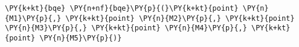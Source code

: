 \begin{Verbatim}[commandchars=\\\{\}]
    \PY{k+kt}{bqe} \PY{n+nf}{bqe}\PY{p}{(}\PY{k+kt}{point} \PY{n}{M1}\PY{p}{,} \PY{k+kt}{point} \PY{n}{M2}\PY{p}{,} \PY{k+kt}{point} \PY{n}{M3}\PY{p}{,} \PY{k+kt}{point} \PY{n}{M4}\PY{p}{,} \PY{k+kt}{point} \PY{n}{M5}\PY{p}{)}
\end{Verbatim}
